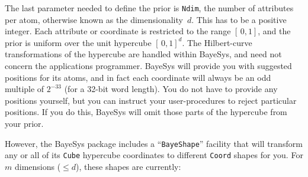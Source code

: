 \bigskip
{}
\smallskip

The last parameter needed to define the prior is {\tt Ndim}, the number of attributes per atom, otherwise known as the dimensionality~$d$. 
This has to be a positive integer.
Each attribute or coordinate is restricted to the range $[\,0,1]$, and the prior is uniform over the unit hypercube $[\,0,1]^d$.
The Hilbert-curve transformations of the hypercube are handled within BayeSys, and need not concern the applications programmer.
BayeSys will provide you with suggested positions for its atoms, 
and in fact each coordinate will always be an odd multiple of $2^{-33}$ (for a 32-bit word length).
You do not have to provide any positions yourself, but you can instruct your user-procedures to reject particular positions.
If you do this, BayeSys will omit those parts of the hypercube from your prior.

However, the BayeSys package includes a ``{\tt BayeShape}'' facility that will transform any or all of its {\tt Cube} hypercube coordinates to different {\tt Coord} shapes for you.
For $m$ dimensions ($\le d$), these shapes are currently:

